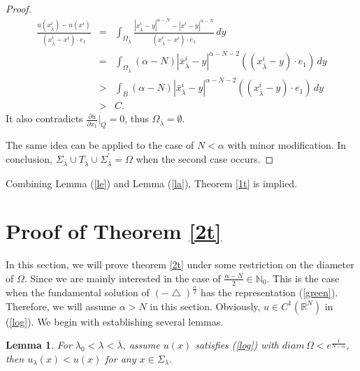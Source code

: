 \documentclass[12pt]{amsproc}
\theoremstyle{plain}
\numberwithin{equation}{section}
\newtheorem{lem}{Lemma}[section]
\begin{document}
\begin{proof}
\begin{eqnarray}
\frac{u(x^i_{\bar\lambda})-u(x^i)}{(x^i_{\bar\lambda}-x^i)\cdot
e_1}&=&\int_{\Omega_{\bar\lambda}}\frac{|x^i_{\bar\lambda}-y|^{\alpha-N}-|x^i-y|^{\alpha-N}}
{(x^i_{\bar\lambda}-x^i)\cdot e_1} \,dy \nonumber \\
&=&\int_{\Omega_{\bar\lambda}}(\alpha-N)|\bar
x^i_{\bar\lambda}-y|^{\alpha-N-2}((x^i_{\bar\lambda}-y)\cdot
e_1)\,dy
\nonumber \\
&>& \int_{B}(\alpha-N)|\bar
x^i_{\bar\lambda}-y|^{\alpha-N-2}((x^i_{\bar\lambda}-y)\cdot e_1)\,dy \nonumber \\
 &>& C.
\end{eqnarray}
It also contradicts  $\frac{\partial u}{\partial x_1}|_Q=0$, thus
$\Omega_{\bar\lambda}=\emptyset$.

 The same idea can be applied to
the case of $N<\alpha$ with minor modification. In conclusion,
$\Sigma_{\bar\lambda}\cup
T_{\bar\lambda}\cup\Sigma^\prime_{\bar\lambda}=\Omega$ when the
second case occurs.
\end{proof}

Combining Lemma (\ref{le}) and Lemma (\ref{la}), Theorem \ref{1t} is
implied.

\section{Proof of Theorem \ref{2t}}

In this section, we will prove theorem \ref{2t} under some
restriction on the diameter of
 $\Omega$. Since we are mainly interested in
 the case of
$\frac{\alpha-N}{2}\in \mathbb N_0$. This is the case when the
fundamental solution of $(-\bigtriangleup)^{\frac{\alpha}{2}}$ has
the representation (\ref{green}). Therefore, we will assume
$\alpha>N$ in this section. Obviously, $u \in C^{1}(\mathbb R^N)$ in
(\ref{log}). We begin with establishing  several lemmas.

\begin{lem}

For $ \lambda_0<\lambda<\bar\lambda$, assume $u(x)$ satisfies
(\ref{log}) with $diam\, \Omega< e^{\frac{1}{N-\alpha}}$, then
$u_\lambda(x)<u(x)$ for any $x\in \Sigma_\lambda$.
\end{lem}
\end{document}
